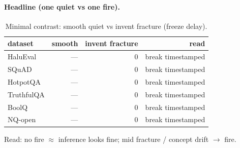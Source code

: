 \documentclass[11pt]{article}
\begin{document}
\paragraph{Headline (one quiet vs one fire).}
\begin{table}[h]
\centering
\caption{Minimal contrast: smooth quiet vs invent fracture (freeze delay).}
\begin{tabular}{lrrr}
\toprule
dataset & smooth & invent fracture & read \\
\midrule
HaluEval   & --- & 0 & break timestamped \\
SQuAD      & --- & 0 & break timestamped \\
HotpotQA   & --- & 0 & break timestamped \\
TruthfulQA & --- & 0 & break timestamped \\
BoolQ      & --- & 0 & break timestamped \\
NQ-open    & --- & 0 & break timestamped \\
\bottomrule
\end{tabular}
\end{table}

\noindent
Read: no fire $\approx$ inference looks fine; mid fracture / concept drift $\to$ fire.
\end{document}
